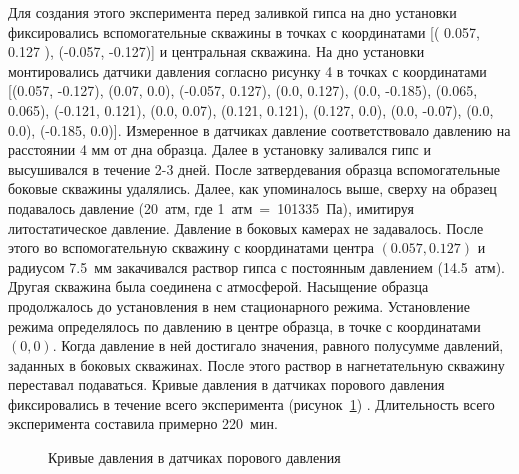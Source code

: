 Для создания этого эксперимента перед заливкой гипса на дно установки фиксировались вспомогательные скважины в точках с координатами [( 0.057, 0.127 ), (-0.057, -0.127)] и центральная скважина. На дно установки монтировались датчики давления согласно рисунку 4 в точках с координатами [(0.057, -0.127), (0.07, 0.0), (-0.057, 0.127), (0.0, 0.127), (0.0, -0.185), (0.065, 0.065), (-0.121, 0.121), (0.0, 0.07), (0.121, 0.121), (0.127, 0.0), (0.0, -0.07), (0.0, 0.0), (-0.185, 0.0)].  Измеренное в датчиках давление соответствовало давлению на расстоянии 4 мм от дна образца. Далее в установку заливался гипс и высушивался в течение 2-3 дней. После затвердевания образца вспомогательные боковые скважины удалялись. Далее, как упоминалось выше, сверху на образец подавалось давление (20~атм, где 1~атм~=~101335~Па), имитируя литостатическое давление. Давление в боковых камерах не задавалось. После этого во вспомогательную скважину с координатами центра $(0.057, 0.127 )$ и радиусом 7.5~мм закачивался раствор гипса с постоянным давлением (14.5~атм). Другая скважина была соединена с атмосферой. Насыщение образца продолжалось до установления в нем стационарного режима. Установление режима определялось по давлению в  центре образца, в точке с координатами $(0, 0)$. Когда давление в ней достигало значения, равного полусумме давлений, заданных в боковых скважинах. После этого раствор в нагнетательную скважину переставал подаваться. Кривые давления в датчиках порового давления фиксировались в течение всего эксперимента (рисунок~\ref{device4:pict}) . Длительность всего эксперимента составила примерно 220~мин. 

\begin{figure}[hb]
\begin{center}
\end{center}
\caption{Кривые давления в датчиках порового давления}\label{device4:pict}
\end{figure}



